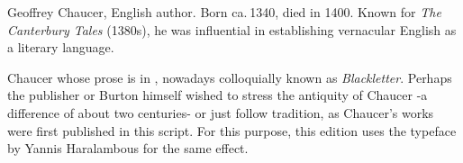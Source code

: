 {  \settoheight{\ChaucerPortraitHeight}{\usebox{\ChaucerPortraitBox}}
  \vspace*{-\ChaucerPortraitHeight-2\baselineskip}
  \par{\noindent\hfil\usebox{\ChaucerPortraitBox}\hfil\par
    \vspace*{\baselineskip}
  Geoffrey Chaucer, English author. Born ca. 1340, died in 1400. Known for \emph{The Canterbury Tales} (1380s), he was influential in establishing vernacular English as a literary language.}}Chaucer whose prose is in , nowadays colloquially known as \emph{Blackletter}. Perhaps the publisher or Burton himself wished to stress the antiquity of Chaucer -a difference of about two centuries- or just follow tradition, as Chaucer's works were first published in this script. For this purpose, this edition uses the \href{https://ctan.org/pkg/ygoth}{} typeface by Yannis Haralambous for the same effect.

\clearpage{}
\thispagestyle{titleontop}
\vspace*{\fill} 
\begin{quote} 
\centering 
{\huge{}}
\end{quote}
\vspace*{\fill}

